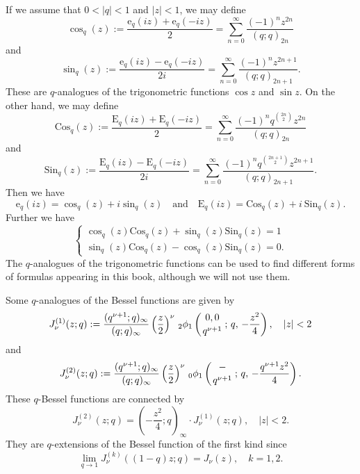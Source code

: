 \documentclass[envcountchap,graybox]{svmono}
\newcommand{\qhyp}[5]{\mbox{}_{#1}{\phi}_{#2}
\left(\genfrac{}{}{0pt}{}{#3}{#4}\,;\,q,\,#5\right)}
\renewcommand{\E}{\textrm{E}}
\begin{document}
If we assume that $0<|q|<1$ and $|z|<1$, we may define
\begin{equation}
\label{qcos1}
\cos_q(z):=\frac{{\mathrm e}_q(iz)+{\mathrm e}_q(-iz)}{2}=
\sum_{n=0}^{\infty}\frac{(-1)^nz^{2n}}{(q;q)_{2n}}
\end{equation}
and
\begin{equation}
\label{qsin1}
\sin_q(z):=\frac{{\mathrm e}_q(iz)-{\mathrm e}_q(-iz)}{2i}=
\sum_{n=0}^{\infty}\frac{(-1)^nz^{2n+1}}{(q;q)_{2n+1}}.
\end{equation}
These are $q$-analogues of the trigonometric functions $\cos z$ and $\sin z$.
On the other hand, we may define
\begin{equation}
\label{qcos2}
\textrm{Cos}_q(z):=\frac{\E_q(iz)+\E_q(-iz)}{2}
=\sum_{n=0}^{\infty}\frac{(-1)^nq^{\binom{2n}{2}}z^{2n}}{(q;q)_{2n}}
\end{equation}
and
\begin{equation}
\label{qsin2}
\textrm{Sin}_q(z):=\frac{\E_q(iz)-\E_q(-iz)}{2i}
=\sum_{n=0}^{\infty}\frac{(-1)^nq^{\binom{2n+1}{2}}z^{2n+1}}{(q;q)_{2n+1}}.
\end{equation}
Then we have
$${\mathrm e}_q(iz)=\cos_q(z)+i\sin_q(z)\quad\textrm{and}\quad \E_q(iz)=\textrm{Cos}_q(z)+i\:\textrm{Sin}_q(z).$$
Further we have
$$\left\{\begin{array}{l}\cos_q(z)\textrm{Cos}_q(z)+\sin_q(z)\textrm{Sin}_q(z)=1\\[5mm]
\sin_q(z)\textrm{Cos}_q(z)-\cos_q(z)\textrm{Sin}_q(z)=0.\end{array}\right.$$
The $q$-analogues of the trigonometric functions can be used to find
different forms of formulas appearing in this book, although we will not
use them.

Some $q$-analogues of the Bessel functions are given by
\begin{equation}
\label{qBessel1}\index{q-Bessel function@$q$-Bessel function}
\index{Jackson's q-Bessel function@Jackson's $q$-Bessel function}
J_{\nu}^{(1)}(z;q):=\frac{(q^{\nu+1};q)_{\infty}}{(q;q)_{\infty}}
\left(\frac{z}{2}\right)^{\nu}\,\qhyp{2}{1}{0,0}{q^{\nu+1}}{-\frac{z^2}{4}},\quad |z|<2
\end{equation}
and
\begin{equation}
\label{qBessel2}
J_{\nu}^{(2)}(z;q):=\frac{(q^{\nu+1};q)_{\infty}}{(q;q)_{\infty}}
\left(\frac{z}{2}\right)^{\nu}\,\qhyp{0}{1}{-}{q^{\nu+1}}{-\frac{q^{\nu+1}z^2}{4}}.
\end{equation}
These $q$-Bessel functions are connected by
$$J_{\nu}^{(2)}(z;q)=(-\frac{z^2}{4};q)_{\infty}\cdot J_{\nu}^{(1)}(z;q),\quad |z|<2.$$
They are $q$-extensions of the Bessel function of the first kind since
$$\lim\limits_{q\rightarrow 1}J_{\nu}^{(k)}((1-q)z;q)=J_{\nu}(z),\quad k=1,2.$$
\end{document}
